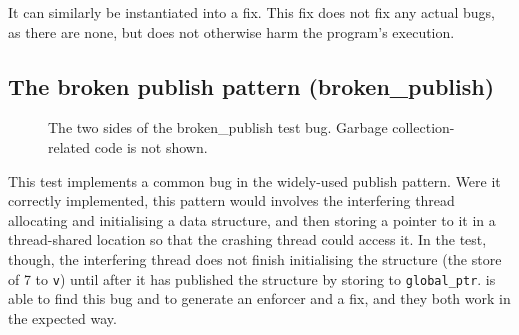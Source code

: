 It can similarly be instantiated into a fix.  This fix does not fix
any actual bugs, as there are none, but does not otherwise harm the
program's execution.

\subsection{The broken publish pattern (broken\_publish)}

\begin{figure}
  \caption{The two sides of the broken\_publish test bug.  Garbage
    collection-related code is not shown.}
  \label{fig:eval:broken_publish}
\end{figure}

This test implements a common bug in the widely-used publish
pattern\needCite{}.  Were it correctly implemented, this pattern would
involves the interfering thread allocating and initialising a data
structure, and then storing a pointer to it in a thread-shared
location so that the crashing thread could access it.  In the test,
though, the interfering thread does not finish initialising the
structure (the store of 7 to \texttt{v}) until after it has published
the structure by storing to \texttt{global\_ptr}.  {\Implementation}
is able to find this bug and to generate an enforcer and a fix, and
they both work in the expected way.

